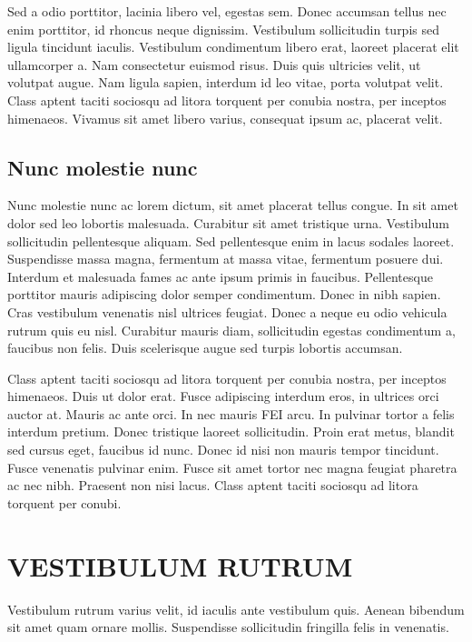 \documentclass[rascunho,xindy]{fei}
\begin{document}
Sed a odio porttitor, lacinia libero vel, egestas sem. Donec accumsan tellus nec enim porttitor, id rhoncus neque dignissim. Vestibulum sollicitudin turpis sed ligula tincidunt iaculis. Vestibulum condimentum libero erat, laoreet placerat elit ullamcorper a. Nam consectetur euismod risus. Duis quis ultricies velit, ut volutpat augue. Nam ligula sapien, interdum id leo vitae, porta volutpat velit. Class aptent taciti sociosqu ad litora torquent per conubia nostra, per inceptos himenaeos. Vivamus sit amet libero varius, consequat ipsum ac, placerat velit.

\section{Nunc molestie nunc}

Nunc molestie nunc ac lorem dictum, sit amet placerat tellus congue. In sit amet dolor sed leo lobortis malesuada. Curabitur sit amet tristique urna. Vestibulum sollicitudin pellentesque aliquam. Sed pellentesque enim in lacus sodales laoreet. Suspendisse massa magna, fermentum at massa vitae, fermentum posuere dui. Interdum et malesuada fames ac ante ipsum primis in faucibus. Pellentesque porttitor mauris adipiscing dolor semper condimentum. Donec in nibh sapien. Cras vestibulum venenatis nisl ultrices feugiat. Donec a neque eu odio vehicula rutrum quis eu nisl. Curabitur mauris diam, sollicitudin egestas condimentum a, faucibus non felis. Duis scelerisque augue sed turpis lobortis accumsan.

Class aptent taciti sociosqu ad litora torquent per conubia nostra, per inceptos himenaeos. Duis ut dolor erat. Fusce adipiscing interdum eros, in ultrices orci auctor at. Mauris ac ante orci. In nec mauris FEI arcu. In pulvinar tortor a felis interdum pretium. Donec tristique laoreet sollicitudin. Proin erat metus, blandit sed cursus eget, faucibus id nunc. Donec id nisi non mauris tempor tincidunt. Fusce venenatis pulvinar enim. Fusce sit amet tortor nec magna feugiat pharetra ac nec nibh. Praesent non nisi lacus. Class aptent taciti sociosqu ad litora torquent per conubi.

\chapter{VESTIBULUM RUTRUM}

Vestibulum rutrum varius velit, id iaculis ante vestibulum quis. Aenean bibendum sit amet quam ornare mollis. Suspendisse sollicitudin fringilla felis in venenatis.
\end{document}

